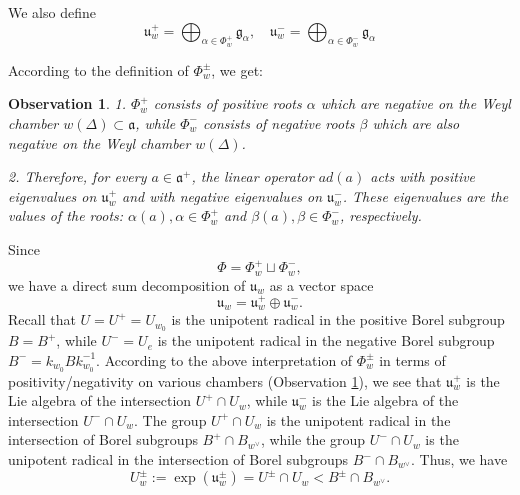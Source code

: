 \documentclass[12pt]{amsbook}%
\newtheorem{obs}[thm]{Observation}
\theoremstyle{definition}
\theoremstyle{remark}
\numberwithin{section}{chapter}
\numberwithin{subsection}{section}
\numberwithin{figure}{chapter}
\def\al{\alpha}
\begin{document}
{{We also define 
\begin{equation} \label{eq_lie_alg_w}
\mathfrak{u}_w^+=\bigoplus_{\alpha\in\Phi_w^+}{\mathfrak g}_{\alpha}, \quad \mathfrak{u}_w^-=\bigoplus_{\alpha\in\Phi_w^-}{\mathfrak g}_{\alpha}
\end{equation}


According to the definition of $\Phi_w^\pm$, we get: 

\begin{obs}\label{obs:signs}
1. $\Phi_w^+$ consists of positive roots $\alpha$ which are negative on the Weyl chamber $w(\Delta)\subset {\mathfrak a}$, 
while  $\Phi_w^-$ consists of negative roots $\beta$ which are also negative on the Weyl chamber $w(\Delta)$. 

2. Therefore, for every $a\in {\mathfrak a}^+$, the linear operator $ad(a)$ acts with positive eigenvalues on 
$\mathfrak{u}_w^+$ and with negative eigenvalues on $\mathfrak{u}_w^-$. These eigenvalues are the values of the roots: 
$\al(a), \al\in \Phi^+_w$ and $\beta(a), \beta\in \Phi^-_w$, respectively. 
\end{obs}

Since 
$$
\Phi= \Phi_w^+ \sqcup \Phi_w^-, 
$$
we have a direct sum decomposition of $\mathfrak{u}_w$ as a vector space 
\[
\mathfrak{u}_w=\mathfrak{u}_w^+\oplus\mathfrak{u}_w^-.
\]
Recall that $U=U^+=U_{w_0}$ is the unipotent radical in the positive Borel subgroup $B=B^+$, while $U^-=U_e$ is the unipotent radical in the 
negative Borel subgroup $B^-=k_{w_0} B k_{w_0}^{-1}$. 
According to the above interpretation of $\Phi_w^\pm$ in terms of positivity/negativity on various chambers (Observation \ref{obs:signs}), we see that %
$\mathfrak{u}_w^+$ is the Lie algebra of the intersection $U^+\cap U_w$, while  
$\mathfrak{u}_w^-$ is the Lie algebra of the intersection $U^-\cap U_w$. The group 
$U^+\cap U_w$ is the unipotent radical 
in the intersection of Borel subgroups $B^+\cap B_{w^\vee}$, 
while the group $U^-\cap U_w$ is the unipotent radical 
in the intersection of Borel subgroups $B^-\cap B_{w^\vee}$. Thus, we have  
\begin{equation} \label{eq_subgroups_w}
U_w^\pm:=\exp(\mathfrak{u}_w^\pm)= U^\pm \cap U_w< B^\pm \cap B_{w^\vee}. 
\end{equation}


}}
\end{document}
